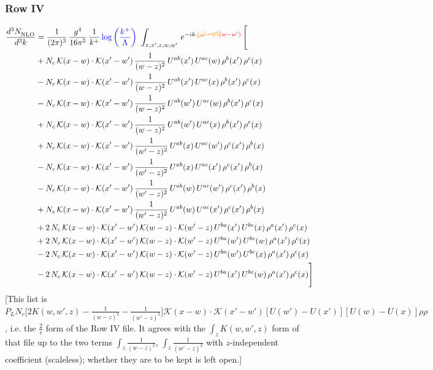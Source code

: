 \documentclass[9pt]{article}
\numberwithin{equation}{section}
\begin{document}
\subsubsection{Row IV}
\begin{align}
    \frac{d^{3}N_{\rm NLO}^{\rm}}{d^{3}k}  & = \frac{1}{(2\pi)^{3}}\,\frac{g^{4}}{16\pi^{5}}\,\frac{1}{k^{+}}\,{\color{blue}\log{\left(\frac{k^{+}}{\Lambda}\right)}}\,\,\int_{x,x',z,w,w'}\,e^{-ik\cdot{\color{orange}\cancel{(w'-w)}}{\color{red}(w-w')}}\,\Bigg[\notag \\ & +N_{c}\,\mathcal{K}(x-w)\cdot\mathcal{K}(x'-w')\,\frac{1}{(w-z)^{2}}\,U^{ab}(x')\,U^{ac}(w)\,\rho^{b}(x')\,\rho^{c}(x)\notag\\
&-N_{c}\,\mathcal{K}(x-w)\cdot\mathcal{K}(x'-w')\,\frac{1}{(w-z)^{2}}\,U^{ab}(x')\,U^{ac}(x)\,\rho^{b}(x')\,\rho^{c}(x)\notag\\
&-N_{c}\,\mathcal{K}(x-w)\cdot\mathcal{K}(x'-w')\,\frac{1}{(w-z)^{2}}\,U^{ab}(w')\,U^{ac}(w)\,\rho^{b}(x')\,\rho^{c}(x)\notag\\
&+N_{c}\,\mathcal{K}(x-w)\cdot\mathcal{K}(x'-w')\,\frac{1}{(w-z)^{2}}\,U^{ab}(w')\,U^{ac}(x)\,\rho^{b}(x')\,\rho^{c}(x)\notag\\
&+N_{c}\,\mathcal{K}(x-w)\cdot\mathcal{K}(x'-w')\,\frac{1}{(w'-z)^{2}}\,U^{ab}(x)\,U^{ac}(w')\,\rho^{c}(x')\,\rho^{b}(x)\notag\\
&-N_{c}\,\mathcal{K}(x-w)\cdot\mathcal{K}(x'-w')\,\frac{1}{(w'-z)^{2}}\,U^{ab}(x)\,U^{ac}(x')\,\rho^{c}(x')\,\rho^{b}(x)\notag\\
&-N_{c}\,\mathcal{K}(x-w)\cdot\mathcal{K}(x'-w')\,\frac{1}{(w'-z)^{2}}\,U^{ab}(w)\,U^{ac}(w')\,\rho^{c}(x')\,\rho^{b}(x)\notag\\
&+N_{c}\,\mathcal{K}(x-w)\cdot\mathcal{K}(x'-w')\,\frac{1}{(w'-z)^{2}}\,U^{ab}(w)\,U^{ac}(x')\,\rho^{c}(x')\,\rho^{b}(x)\notag\\
&+2\,N_{c}\,\mathcal{K}(x-w)\cdot\mathcal{K}(x'-w')\,\mathcal{K}(w-z)\cdot\mathcal{K}(w'-z)\,U^{ba}(x')\,U^{bc}(x)\,\rho^{a}(x')\,\rho^{c}(x)\notag\\
&+2\,N_{c}\,\mathcal{K}(x-w)\cdot\mathcal{K}(x'-w')\,\mathcal{K}(w-z)\cdot\mathcal{K}(w'-z)\,U^{ba}(w')\,U^{bc}(w)\,\rho^{a}(x')\,\rho^{c}(x)\notag\\
&-2\,N_{c}\,\mathcal{K}(x-w)\cdot\mathcal{K}(x'-w')\,\mathcal{K}(w-z)\cdot\mathcal{K}(w'-z)\,U^{ba}(w')\,U^{bc}(x)\,\rho^{a}(x')\,\rho^{c}(x)\notag\\
&-2\,N_{c}\,\mathcal{K}(x-w)\cdot\mathcal{K}(x'-w')\,\mathcal{K}(w-z)\cdot\mathcal{K}(w'-z)\,U^{ba}(x')\,U^{bc}(w)\,\rho^{a}(x')\,\rho^{c}(x)\Bigg]
\end{align} {\color{red}[This list is $P_{L}N_{c}\big[2K(w,w',z)-\frac{1}{(w-z)^{2}}-\frac{1}{(w'-z)^{2}}\big]\mathcal{K}(x-w)\cdot\mathcal{K}(x'-w')[U(w')-U(x')][U(w)-U(x)]\rho\rho$, i.e. the $\frac{2}{\epsilon}$ form of the Row IV file. It agrees with the $\int_{z}K(w,w',z)$ form of that file up to the two terms $\int_{z}\frac{1}{(w-z)^{2}}$, $\int_{z}\frac{1}{(w'-z)^{2}}$ with $z$-independent coefficient (scaleless); whether they are to be kept is left open.]}\par\noindent
\end{document}
